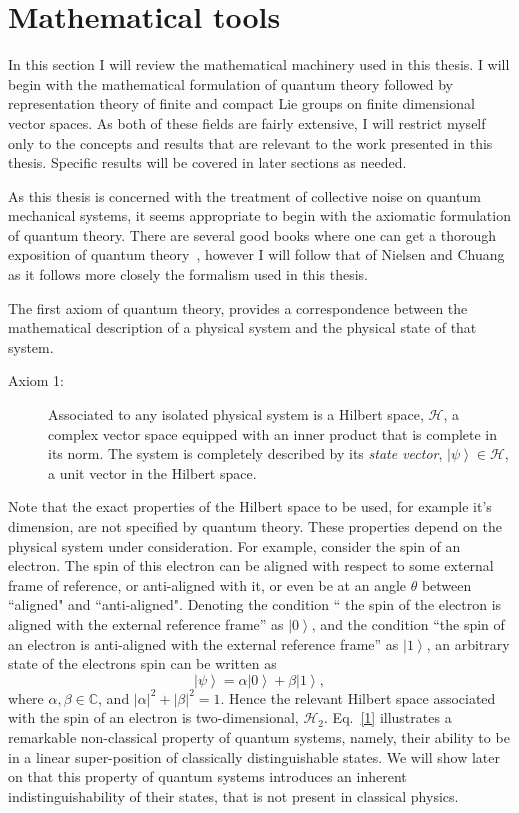 \documentclass{article}
\newcommand{\ket}[1]{\left|#1\right\rangle}
\newcommand\defn[1]{\textsl{#1}}
\newcommand\cH{{\mathscr{H}}}
\begin{document}
\section{Mathematical tools}

In this section I will review the mathematical machinery used in this thesis. I will begin with the mathematical formulation of quantum theory followed by representation theory of finite and
compact Lie groups on finite dimensional vector spaces.  As both of these fields
are fairly extensive, I will restrict myself only to the concepts and results
that are relevant to the work presented in this thesis.  Specific results will be covered in
later sections as needed.

As this thesis is concerned with the treatment of collective noise on quantum mechanical systems, it seems appropriate to begin with the axiomatic formulation of
quantum theory.  There are several good books where one can get a thorough
exposition of quantum theory~\cite{}, however I will follow that of Nielsen and
Chuang~\cite{} as it follows more closely the formalism used in this thesis.

The first axiom of quantum theory, provides a correspondence between the
mathematical description of a physical system and the physical state of that
system.
\begin{description}
 \item[Axiom 1:]  Associated to any isolated physical system is a Hilbert space,
$\cH$, a complex vector space equipped with an inner product that is complete in its norm.  The system is completely described by its \defn{state vector}, $\ket{\psi}\in \cH$, a unit vector in the Hilbert space.
\end{description}
Note that the exact properties of the Hilbert space to be used, for example
it's dimension, are not specified by quantum theory.  These properties depend on
the physical system under consideration.  For example, consider the spin of an
electron.  The spin of this electron can be aligned with respect to some
external frame of reference, or anti-aligned with it, or even be at an angle
$\theta$ between ``aligned" and ``anti-aligned".  Denoting the condition `` the spin of the electron is aligned with the external reference frame'' as $\ket{0}$, and the condition ``the spin of an electron is anti-aligned with the external reference frame'' as $\ket{1}$, an arbitrary state of the electrons spin can be written as 
\begin{equation}
\ket{\psi}=\alpha\ket{0}+\beta\ket{1},
\label{1}
\end{equation}  
where $\alpha,\beta\in\mathbb{C}$, and $\lvert\alpha\rvert^2+\lvert\beta\rvert^2=1$.
Hence the relevant Hilbert space associated with the spin of an electron is two-dimensional, $\cH_2$. Eq.~\eqref{1} illustrates a remarkable non-classical property of quantum systems, namely, their ability to be in a linear super-position of classically distinguishable states.  We will show later on that this property of quantum systems introduces an inherent indistinguishability of their states, that is not present in classical physics.   
\end{document}
